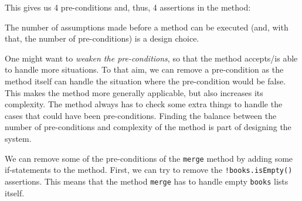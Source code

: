 This gives us 4 pre-conditions and, thus, 4 assertions in the method:

\begin{Shaded}
\begin{Highlighting}[]
 

    \NormalTok{(}\NormalTok{\textless{}}
\NormalTok{ : }\NormalTok{;}
\NormalTok{ : }\NormalTok{;}
\NormalTok{() : }\NormalTok{;}
\NormalTok{;}

\NormalTok{  \}}
\NormalTok{\}}
\end{Highlighting}
\end{Shaded}

The number of assumptions made before a method can be executed (and,
with that, the number of pre-conditions) is a design choice.

One might want to \emph{weaken the pre-conditions}, so that the method
accepts/is able to handle more situations. To that aim, we can remove a
pre-condition as the method itself can handle the situation where the
pre-condition would be false. This makes the method more generally
applicable, but also increases its complexity. The method always has to
check some extra things to handle the cases that could have been
pre-conditions. Finding the balance between the number of pre-conditions
and complexity of the method is part of designing the system.

We can remove some of the pre-conditions of the \texttt{merge} method by
adding some if-statements to the method. First, we can try to remove the
\texttt{!books.isEmpty()} assertions. This means that the method
\texttt{merge} has to handle empty \texttt{books} lists itself.

